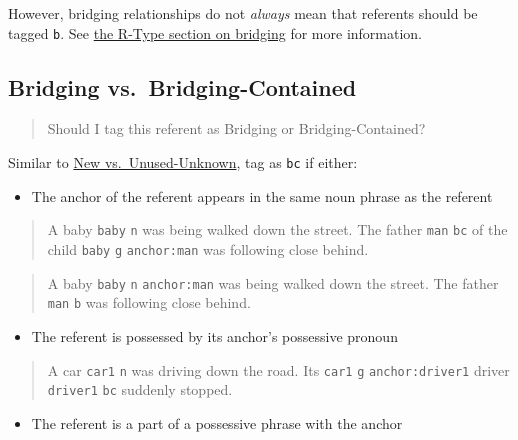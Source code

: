 \documentclass[
]{book}
\providecommand{\tightlist}{%
  \setlength{\itemsep}{0pt}\setlength{\parskip}{0pt}}
\begin{document}
However, bridging relationships do not \emph{always} mean that
referents should be tagged \texttt{b}.
See \protect\hyperlink{bridging}{the R-Type section on bridging} for more information.

\hypertarget{bridging-vs.-bridging-contained}{%
\subsection{Bridging vs.~Bridging-Contained}\label{bridging-vs.-bridging-contained}}

\begin{quote}
Should I tag this referent as Bridging or Bridging-Contained?
\end{quote}

Similar to \protect\hyperlink{new-vs.-unused-unknown}{New vs.~Unused-Unknown},
tag as \texttt{bc} if either:

\begin{itemize}
\tightlist
\item
  The anchor of the referent appears in the same noun phrase as the referent
\end{itemize}

\begin{quote}
A baby \texttt{baby} \texttt{n} was being walked down the street.
The father \texttt{man} \texttt{bc} of the child \texttt{baby} \texttt{g} \texttt{anchor:man} was following close behind.
\end{quote}

\begin{quote}
A baby \texttt{baby} \texttt{n} \texttt{anchor:man} was being walked down the street.
The father \texttt{man} \texttt{b} was following close behind.
\end{quote}

\begin{itemize}
\tightlist
\item
  The referent is possessed by its anchor's possessive pronoun
\end{itemize}

\begin{quote}
A car \texttt{car1} \texttt{n} was driving down the road.
Its \texttt{car1} \texttt{g} \texttt{anchor:driver1} driver \texttt{driver1} \texttt{bc} suddenly stopped.
\end{quote}

\begin{itemize}
\tightlist
\item
  The referent is a part of a possessive phrase with the anchor
\end{itemize}
\end{document}
